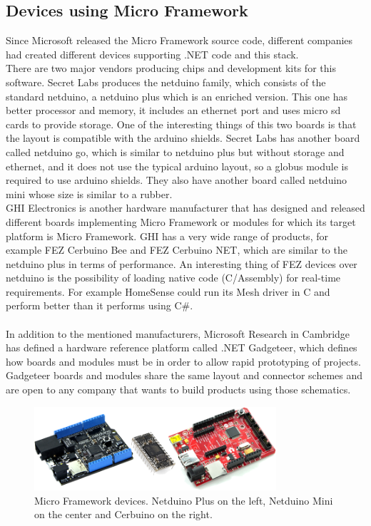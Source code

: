 \subsection{Devices using Micro Framework}\label{SS:SOTA-MicroFramework-Devices}
Since Microsoft released the Micro Framework source code, different companies had created different devices supporting .NET code and this stack.
\\
There are two major vendors producing chips and development kits for this software. Secret Labs produces the netduino family, which consists of the standard netduino, a netduino plus which is an enriched version. This one has better processor and memory, it includes an ethernet port and uses micro sd cards to provide storage. One of the interesting things of this two boards is that the layout is compatible with the arduino shields.
Secret Labs has another board called netduino go, which is similar to netduino plus but without storage and ethernet, and it does not use the typical arduino layout, so a globus module is required to use arduino shields. They also have another board called netduino mini whose size is similar to a rubber.
\\
GHI Electronics is another hardware manufacturer that has designed and released different boards implementing Micro Framework or modules for which its target platform is Micro Framework. GHI has a very wide range of products, for example FEZ Cerbuino Bee and FEZ Cerbuino NET, which are similar to the netduino plus in terms of performance. An interesting thing of FEZ devices over netduino is the possibility of loading native code (C/Assembly) for real-time requirements. For example HomeSense could run its Mesh driver in C and perform better than it performs using C\#.
\\
\\
In addition to the mentioned manufacturers, Microsoft Research in Cambridge has defined a hardware reference platform called .NET Gadgeteer, which defines how boards and modules must be in order to allow rapid prototyping of projects. Gadgeteer boards and modules share the same layout and connector schemes and are open to any company that wants to build products using those schematics.
\begin{figure}[H]\begin{center}
 \centering
  \captionsetup{justification=centering}
  \includegraphics[width=0.8\textwidth]{pictures/stateoftheart/devices}
  \caption{Micro Framework devices. Netduino Plus on the left, Netduino Mini on the center and Cerbuino on the right.\label{fig:State-Art-NETMF-Boards}}
\end{center}\end{figure}

